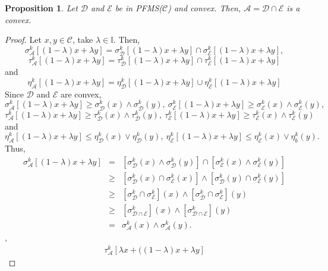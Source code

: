 \documentclass[12pt,letterpaper]{amsart}
\theoremstyle{plain}
\newtheorem{proposition}{Proposition}[section]
\theoremstyle{definition}
\numberwithin{equation}{section}
\begin{document}
\begin{proposition} \label{i}
Let $\mathcal{D}$ and $\mathcal{E}$ be in PFMS($\mathcal{C}$) and convex. Then, $\mathcal{A} = \mathcal{D} \cap \mathcal{E}$ is a convex.
\end{proposition}

\begin{proof}
Let $x, y \in \mathcal{C}$, take $\lambda \in \mathbb{I}$. Then, $$\sigma^k_{\mathcal{A}} [(1 - \lambda)x + \lambda y] = \sigma^k_{\mathcal{D}} [(1 - \lambda)x + \lambda y] \cap \sigma^k_{\mathcal{E}} [(1 - \lambda)x + \lambda y],$$ $$\tau^k_{\mathcal{A}} [(1 - \lambda)x + \lambda y] = \tau^k_{\mathcal{D}} [(1 - \lambda)x + \lambda y] \cap \tau^k_{\mathcal{E}} [(1 - \lambda)x + \lambda y]$$ and $$\eta^k_{\mathcal{A}} [(1 - \lambda)x + \lambda y] = \eta^k_{\mathcal{D}} [(1 - \lambda)x + \lambda y] \cup \eta^k_{\mathcal{E}} [(1 - \lambda)x + \lambda y]$$ Since $\mathcal{D}$ and $\mathcal{E}$ are convex, $$\sigma^k_{\mathcal{A}} [(1 - \lambda)x + \lambda y] \geq \sigma^k_{\mathcal{D}}(x) \wedge \sigma^k_{\mathcal{D}}(y),~ \sigma^k_{\mathcal{E}} [(1 - \lambda)x + \lambda y] \geq \sigma^k_{\mathcal{E}}(x) \wedge \sigma^k_{\mathcal{E}}(y),$$ $$\tau^k_{\mathcal{A}} [(1 - \lambda)x + \lambda y] \geq \tau^k_{\mathcal{D}}(x) \wedge \tau^k_{\mathcal{D}}(y),~ \tau^k_{\mathcal{E}} [(1 - \lambda)x + \lambda y] \geq \tau^k_{\mathcal{E}}(x) \wedge \tau^k_{\mathcal{E}}(y)$$ and $$\eta^k_{\mathcal{A}} [(1 - \lambda)x + \lambda y] \leq \eta^k_{\mathcal{D}}(x) \vee \eta^k_{\mathcal{D}}(y),~ \eta^k_{\mathcal{E}} [(1 - \lambda)x + \lambda y] \leq \eta^k_{\mathcal{E}}(x) \vee \eta^k_{b}(y).$$ Thus, 
\begin{eqnarray*} \sigma^k_{\mathcal{A}} [(1 - \lambda)x + \lambda y]  
& = & [\sigma^k_{\mathcal{D}} (x) \wedge \sigma^k_{\mathcal{D}} (y)] \cap [\sigma^k_{\mathcal{E}} (x) \wedge \sigma^k_{\mathcal{E}} (y)]\\
&\geq & [\sigma^k_{\mathcal{D}}(x) \cap \sigma^k_{\mathcal{E}}(x)] \wedge [\sigma^k_{\mathcal{D}}(y) \cap \sigma^k_{\mathcal{E}}(y)]\\
&\geq &[\sigma^k_{\mathcal{D}} \cap \sigma^k_{\mathcal{E}}](x) \wedge [\sigma^k_{\mathcal{D}} \cap \sigma^k_{\mathcal{E}}](y)\\ & \geq & [\sigma^k_{\mathcal{D}\cap \mathcal{E}}](x) \wedge [\sigma^k_{\mathcal{D} \cap \mathcal{E} }](y)\\ & = & \sigma^k_{\mathcal{A}} (x) \wedge \sigma^k_{\mathcal{A}} (y).
\end{eqnarray*},
\begin{eqnarray*} \tau^k_{\mathcal{A}} [\lambda x + ((1 - \lambda)x + \lambda y]  

\end{eqnarray*}
\end{proof}
\end{document}
